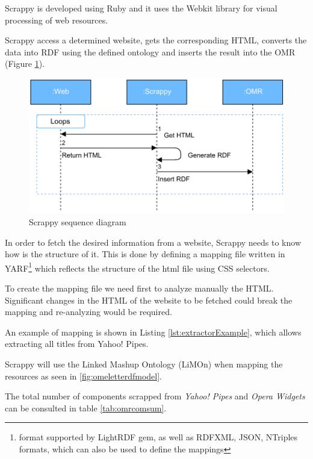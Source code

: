 Scrappy is developed using Ruby and it uses the Webkit library for visual processing of web resources.

Scrappy access a determined website, gets the corresponding HTML, converts the data into RDF using the defined ontology and inserts the result into the OMR (Figure \ref{fig:scrappysequence}).

\begin{figure}[h]
	\centering
	\includegraphics[width=350pt]{graphics/Diagrama_secuencia_scrappy.pdf}
	\caption{Scrappy sequence diagram}
	\label{fig:scrappysequence}
\end{figure}

In order to fetch the desired information from a website, Scrappy needs to know how is the structure of it. This is done by defining a mapping file written in YARF\footnote{format supported by LightRDF gem, as well as RDFXML, JSON, NTriples formats, which can also be used to define the mappings} which reflects the structure of the html file using CSS selectors.

To create the mapping file we need first to analyze manually the HTML. Significant changes in the HTML of the website to be fetched could break the mapping and re-analyzing would be required.

An example of mapping is shown in Listing \ref{lst:extractorExample}, which allows extracting all titles from Yahoo! Pipes.

Scrappy will use the Linked Mashup Ontology (LiMOn) when mapping the resources as seen in \ref{fig:omeletterdfmodel}.

The total number of components scrapped from \textit{Yahoo! Pipes} and \textit{Opera Widgets} can be consulted in table \ref{tab:omrcomsum}.


